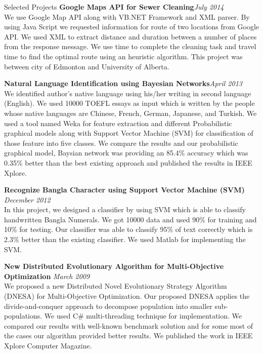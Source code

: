 \documentclass{resume} %
\begin{document}
\begin{rSection}{Selected Projects}
{\bf Google Maps API for Sewer Cleaning}\hfill{\em July 2014}\\
We use Google Map API along with VB.NET Framework and XML parser. By using Java Script we requested information for route of two locations from Google API. We used XML to extract distance and duration between a number of places from the response message. We use time to complete the cleaning task and travel time to find the optimal route using an heuristic algorithm. This project was between city of Edmonton and University of Alberta.

{\bf Natural Language Identification using Bayesian Networks}\hfill {\em April 2013}\\
We identified author’s native language using his/her writing in second language (English). We used 10000 TOEFL essays as input which is written by the people whose native languages are  Chinese, French, German, Japanese, and Turkish. We used a tool named Weka for feature extraction and different Probabilistic graphical models along with Support Vector Machine (SVM) for classification of those feature into five classes. We compare the results and our probabilistic graphical model, Baysian network was providing an  85.4\% accuracy which was 0.35\% better than the best existing approach and published the results in IEEE Xplore.


{\bf Recognize Bangla Character using Support Vector Machine (SVM)}\hfill { \em December 2012}\\
In this project, we designed a classifier by using SVM which is able to classify handwritten Bangla Numerals. We got
10000 data and used 90\% for training and 10\% for testing. 
 Our classifier was able to classify 95\% of text correctly which is 2.3\% better than the existing classifier.
 We used Matlab for implementing the SVM.


{\bf New Distributed Evolutionary Algorithm for Multi-Objective Optimization    }\hfill {\em   March 2009}\\
 We proposed a new Distributed Novel Evolutionary Strategy Algorithm (DNESA) for Multi-Objective Optimization.
 Our proposed DNESA applies the divide-and-conquer approach to decompose population into smaller sub-populations. We used C\# multi-threading technique for implementation.
 We compared our results with well-known benchmark solution and for some most of the cases our algorithm provided better results. We published the work in IEEE Xplore Computer Magazine.


\end{rSection}
\end{document}
